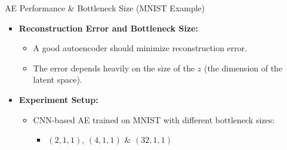 \documentclass[serif, aspectratio=169]{beamer}
\begin{document}
\begin{frame}{AE Performance \& Bottleneck Size (MNIST Example)}
    \begin{itemize}
        \item \textbf{Reconstruction Error and Bottleneck Size:}
        \begin{itemize}
            \item A good autoencoder should minimize reconstruction error.
            \item The error depends heavily on the size of the \( z \) (the dimension of the latent space).
        \end{itemize}
        
        \item \textbf{Experiment Setup:}
        \begin{itemize}
            \item CNN-based AE trained on MNIST with different bottleneck sizes:
            \begin{itemize}
                \item \((2, 1, 1)\), \((4, 1, 1)\) \& \((32, 1, 1)\)
            \end{itemize} 
        \end{itemize}
    \end{itemize}
\end{frame}
\end{document}
